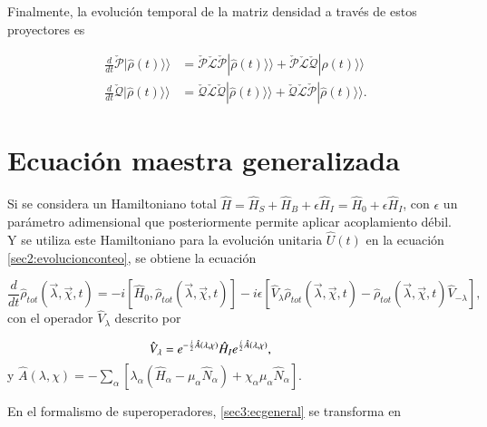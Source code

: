 Finalmente, la evolución temporal de la matriz densidad a través de estos proyectores es 

\begin{align*}
    \frac{d}{dt}\check{\mathcal{P}}|\hat{\rho}(t)\rangle \rangle & = \check{\mathcal{P}}\check{\mathcal{L}}\check{\mathcal{P}}|\hat{\rho}(t)\rangle \rangle  + \check{\mathcal{P}}\check{\mathcal{L}}\check{\mathcal{Q}}|\hat{\rho}(t)\rangle \rangle \\
    \frac{d}{dt}\check{\mathcal{Q}}|\hat{\rho}(t)\rangle \rangle  & = \check{\mathcal{Q}}\check{\mathcal{L}}\check{\mathcal{Q}}|\hat{\rho}(t)\rangle \rangle  + \check{\mathcal{Q}}\check{\mathcal{L}}\check{\mathcal{P}}|\hat{\rho}(t)\rangle \rangle.
\end{align*}

\label{sec2:superop}

\newpage

\section{Ecuación maestra generalizada}
Si se considera un Hamiltoniano total $\hat{H} = \hat{H}_{S} + \hat{H}_{B} + \epsilon \hat{H}_{I} = \hat{H}_{0} + \epsilon \hat{H}_{I}$, con $\epsilon$ un parámetro adimensional que posteriormente permite aplicar acoplamiento débil. Y se utiliza este Hamiltoniano para la evolución unitaria $\hat{U}(t)$ en la ecuación \ref{sec2:evolucionconteo}, se obtiene la ecuación 

\begin{equation}
    \frac{d}{dt}\hat{\rho}_{tot}(\vec{\lambda},\vec{\chi},t) = -i[\hat{H}_{0},\hat{\rho}_{tot}(\vec{\lambda},\vec{\chi},t)] - i\epsilon[\hat{V}_{\lambda} \hat{\rho}_{tot}(\vec{\lambda},\vec{\chi},t) - \hat{\rho}_{tot}(\vec{\lambda},\vec{\chi},t)\hat{V}_{-\lambda}],
    \label{sec3:ecgeneral}
\end{equation}
con el operador $\hat{V}_{\lambda}$ descrito por

\begin{equation*}
    \hat{V}_{\lambda} = e^{-\frac{i}{2}\hat{A}(\lambda,\chi)}\hat{H}_{I}e^{\frac{i}{2}\hat{A}(\lambda,\chi)}, \hspace{14mm}  
\end{equation*}
y $\hat{A}(\lambda,\chi) = -\sum_{\alpha}[\lambda_{\alpha}(\hat{H}_{\alpha} - \mu_{\alpha}\hat{N}_{\alpha}) + \chi_{\alpha}\mu_{\alpha}\hat{N}_{\alpha} ]$. 

En el formalismo de superoperadores, \ref{sec3:ecgeneral} se transforma en 

